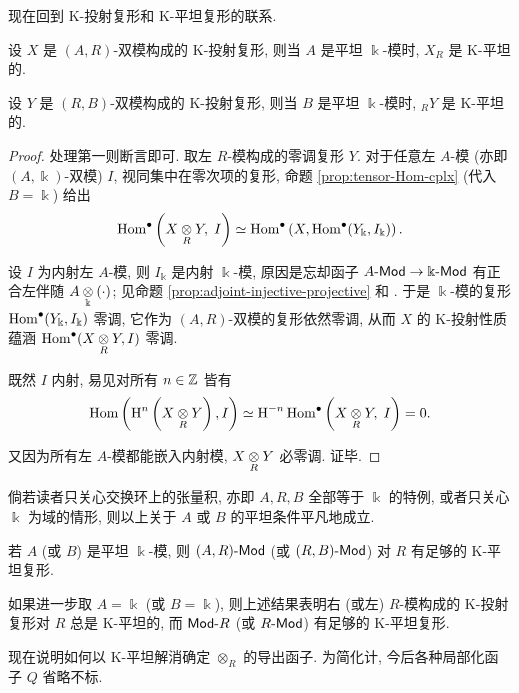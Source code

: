 现在回到 K-投射复形和 K-平坦复形的联系.

\begin{lemma}\label{prop:K-projective-flat}
	设 $X$ 是 $(A, R)$-双模构成的 K-投射复形, 则当 $A$ 是平坦 $\Bbbk$-模时, $X_R$ 是 K-平坦的.
	
	设 $Y$ 是 $(R, B)$-双模构成的 K-投射复形, 则当 $B$ 是平坦 $\Bbbk$-模时, ${}_R Y$ 是 K-平坦的.
\end{lemma}
\begin{proof}
	处理第一则断言即可. 取左 $R$-模构成的零调复形 $Y$. 对于任意左 $A$-模 (亦即 $(A, \Bbbk)$-双模) $I$, 视同集中在零次项的复形, 命题 \ref{prop:tensor-Hom-cplx} (代入 $B = \Bbbk$) 给出
	\[ \operatorname{Hom}^\bullet\left(X \underset{R}{\otimes} Y, \; I\right) \simeq \operatorname{Hom}^\bullet\left(X, \operatorname{Hom}^\bullet(Y_{\Bbbk}, I_{\Bbbk}) \right). \]
	
	设 $I$ 为内射左 $A$-模, 则 $I_{\Bbbk}$ 是内射 $\Bbbk$-模, 原因是忘却函子 $A\text{-}\mathsf{Mod} \to \Bbbk\text{-}\mathsf{Mod}$ 有正合左伴随 $A \underset{\Bbbk}{\otimes} (\cdot)$; 见命题 \ref{prop:adjoint-injective-projective} 和 \cite[推论 6.6.8]{Li1}. 于是 $\Bbbk$-模的复形 $\operatorname{Hom}^\bullet(Y_{\Bbbk}, I_{\Bbbk})$ 零调, 它作为 $(A, R)$-双模的复形依然零调, 从而 $X$ 的 K-投射性质蕴涵 $\operatorname{Hom}^\bullet(X \underset{R}{\otimes} Y, I)$ 零调.

	既然 $I$ 内射, 易见对所有 $n \in \mathbb{Z}$ 皆有
	\[ \operatorname{Hom}\left( \operatorname{H}^n\left( X \underset{R}{\otimes} Y \right), I\right) \simeq \operatorname{H}^{-n} \operatorname{Hom}^\bullet\left( X \underset{R}{\otimes} Y, \; I \right) = 0. \]
	
	又因为所有左 $A$-模都能嵌入内射模, $X \underset{R}{\otimes} Y$ 必零调. 证毕.
\end{proof}

倘若读者只关心交换环上的张量积, 亦即 $A, R, B$ 全部等于 $\Bbbk$ 的特例, 或者只关心 $\Bbbk$ 为域的情形, 则以上关于 $A$ 或 $B$ 的平坦条件平凡地成立.

\begin{corollary}\label{prop:enough-K-flat}
	若 $A$ (或 $B$) 是平坦 $\Bbbk$-模, 则 $(A,R)\text{-}\mathsf{Mod}$ (或 $(R,B)\text{-}\mathsf{Mod}$) 对 $R$ 有足够的 K-平坦复形.
\end{corollary}

如果进一步取 $A = \Bbbk$ (或 $B = \Bbbk$), 则上述结果表明右 (或左) $R$-模构成的 K-投射复形对 $R$ 总是 K-平坦的, 而 $\mathsf{Mod}\text{-}R$ (或 $R\text{-}\mathsf{Mod}$) 有足够的 K-平坦复形.

现在说明如何以 K-平坦解消确定 $\otimes_R$ 的导出函子. 为简化计, 今后各种局部化函子 $Q$ 省略不标.

